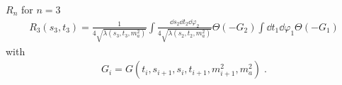 \begin{bluenv}{$R_n$ for $n = 3$}
    \vspace{-3ex}
    \begin{align}
        R_3(s_3, t_3) 
            = \frac{1}{4\sqrt{\lambda(s_3, t_3, m_a^2)}}
              \int \frac{\dd s_2 \dd t_2 \dd \varphi_2}
                        {4 \sqrt{\lambda(s_2, t_2, m_a^2)}}
              \Theta(- G_2) 
              \int \dd t_1 \dd \varphi_1 \Theta(- G_1)
    \end{align}
    with 
    \begin{gather}
        G_i = G(t_i, s_{i+1}, s_i, t_{i+1}, m_{i+1}^2, m_a^2) \; .
    \end{gather}
\end{bluenv}


